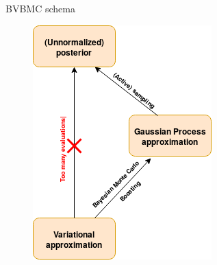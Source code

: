 \documentclass{beamer}
\begin{document}
\begin{frame}{}
\begin{block}{BVBMC schema}
\begin{figure}[h]
\centering
\includegraphics[height=.5\linewidth]{figs/diagram1a.png}
\end{figure}
\end{block}
\end{frame}
\end{document}
